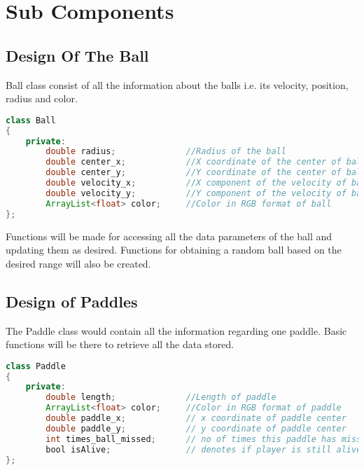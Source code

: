 \documentclass{article}
\begin{document}
	\section{Sub Components}
\subsection{Design Of The Ball} Ball class consist of all the information about the balls i.e. its velocity, position, radius and color.


\begin{lstlisting}[language=Java, caption={Class Parameters for Ball}]
class Ball
{
	private:
		double radius;              //Radius of the ball
		double center_x;            //X coordinate of the center of ball
		double center_y;            //Y coordinate of the center of ball
		double velocity_x;          //X component of the velocity of ball
		double velocity_y;          //Y component of the velocity of ball
		ArrayList<float> color;   	//Color in RGB format of ball
};

\end{lstlisting}

Functions will be made for accessing all the data parameters of the ball and updating them as desired. Functions for obtaining a random ball based on the desired range will also be created.

\subsection{Design of Paddles} The Paddle class would contain all the information regarding one paddle. Basic functions will be there to retrieve all the data stored.

\begin{lstlisting}[language=Java, caption={Class Parameters for Paddle}]
class Paddle
{
	private:
		double length;              //Length of paddle
		ArrayList<float> color;   	//Color in RGB format of paddle
		double paddle_x;			// x coordinate of paddle center
		double paddle_y;			// y coordinate of paddle center
		int times_ball_missed;		// no of times this paddle has missed ball
		bool isAlive;				// denotes if player is still alive
};

\end{lstlisting}
\end{document}

